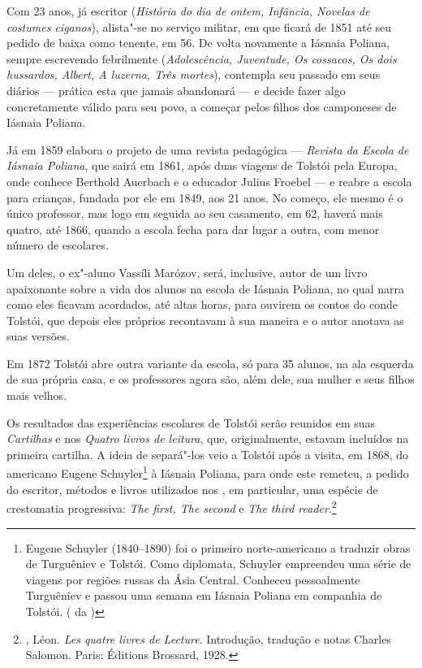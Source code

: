 Com 23 anos, já escritor (\emph{História do dia de ontem,
Infância, Novelas de costumes ciganos}), alista"-se no serviço
militar, em que ficará de 1851 até seu pedido de baixa como
tenente, em 56. De volta novamente a Iásnaia Poliana, sempre
escrevendo febrilmente (\emph{Adolescência, Juventude, Os
cossacos, Os dois hussardos, Albert, A luzerna, Três mortes}),
contempla seu passado em seus diários --- prática esta que jamais
abandonará --- e decide fazer algo concretamente válido para seu
povo, a começar pelos filhos dos camponeses de Iásnaia Poliana.

Já em 1859 elabora o projeto de uma revista pedagógica ---
\emph{Revista da Escola de Iásnaia Poliana}, que sairá
em 1861, após duas viagens de Tolstói pela Europa, onde
conhece Berthold Auerbach e o educador Julius Froebel ---
e reabre a escola para crianças, fundada por ele em 1849,
aos 21 anos. No começo, ele mesmo é o único professor, mas
logo em seguida ao seu casamento, em 62, haverá mais quatro,
até 1866, quando a escola fecha para dar lugar a outra, com
menor número de escolares.

Um deles, o ex"-aluno Vassíli Marózov, será, inclusive, autor de
um livro apaixonante sobre a vida dos alunos na escola de Iásnaia
Poliana, no qual narra como eles ficavam acordados, até altas
horas, para ouvirem os contos do conde Tolstói, que depois eles
próprios recontavam à sua maneira e o autor anotava as suas
versões.

Em 1872 Tolstói abre outra variante da escola, só para 35 alunos,
na ala esquerda de sua própria casa, e os professores agora são,
além dele, sua mulher e seus filhos mais velhos.

Os resultados das experiências escolares de Tolstói serão
reunidos em suas \emph{Cartilhas} e nos \emph{Quatro livros
de leitura}, que, originalmente, estavam incluídos na primeira
cartilha. A ideia de separá"-los veio a Tolstói após a visita,
em 1868, do americano Eugene Schuyler\footnote{Eugene Schuyler
(1840--1890) foi o primeiro norte-americano a traduzir obras de
Turguêniev e Tolstói. Como diplomata, Schuyler empreendeu uma
série de viagens por regiões russas da Ásia Central. Conheceu
pessoalmente Turguêniev e passou uma semana em Iásnaia Poliana
em companhia de Tolstói. ( da )} à Iásnaia Poliana,
para onde este remeteu, a pedido do escritor, métodos e livros
utilizados nos , em particular, uma espécie de
crestomatia progressiva: \emph{The first, The second} e \emph{The third
reader}.\footnote{, Léon. \emph{Les quatre livres de
Lecture}. Introdução, tradução e notas Charles Salomon. Paris:
Éditions Brossard, 1928.}

